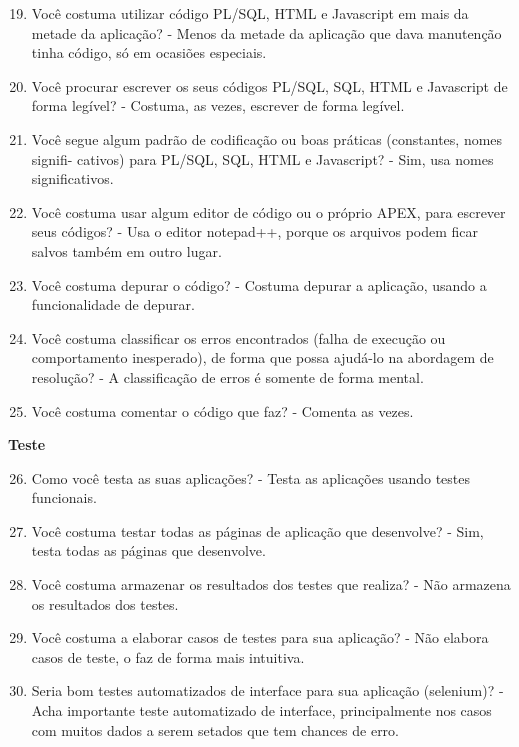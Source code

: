 \begin{apendicesenv}
\begin{enumerate}
	\setcounter{enumi}{18}
	\item Você costuma utilizar código PL/SQL, HTML e Javascript em mais da metade da
	aplicação?\newline
	- Menos da metade da aplicação que dava manutenção tinha código, só em ocasiões especiais.
	\item Você procurar escrever os seus códigos PL/SQL, SQL, HTML e Javascript de forma
	legível?\newline
	- Costuma, as vezes, escrever de forma legível.
	\item Você segue algum padrão de codificação ou boas práticas (constantes, nomes signifi-
	cativos) para PL/SQL, SQL, HTML e Javascript?\newline
	- Sim, usa nomes significativos.
	\item Você costuma usar algum editor de código ou o próprio APEX, para escrever seus
	códigos?\newline
	- Usa o editor notepad++, porque os arquivos podem ficar salvos também em outro lugar.
	\item Você costuma depurar o código?\newline
	- Costuma depurar a aplicação, usando a funcionalidade de depurar.
	\item Você costuma classificar os erros encontrados (falha de execução ou comportamento
	inesperado), de forma que possa ajudá-lo na abordagem de resolução?\newline
	- A classificação de erros é somente de forma mental.
	\item Você costuma comentar o código que faz?\newline
	- Comenta as vezes.
\end{enumerate}

\textbf{Teste}

\begin{enumerate}
	\setcounter{enumi}{25}
	\item Como você testa as suas aplicações?\newline
	- Testa as aplicações usando testes funcionais.
	\item Você costuma testar todas as páginas de aplicação que desenvolve?\newline
	- Sim, testa todas as páginas que desenvolve.
	\item Você costuma armazenar os resultados dos testes que realiza?\newline
	- Não armazena os resultados dos testes.
	\item Você costuma a elaborar casos de testes para sua aplicação?\newline
	- Não elabora casos de teste, o faz de forma mais intuitiva.
	\item Seria bom testes automatizados de interface para sua aplicação (selenium)?\newline
	- Acha importante teste automatizado de interface, principalmente nos casos com muitos dados a serem setados que tem chances de erro.
\end{enumerate}


\end{apendicesenv}

